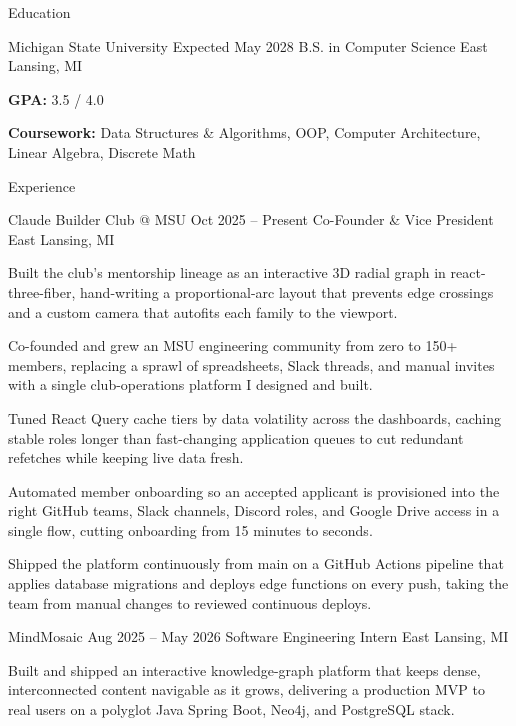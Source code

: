 \documentclass[
	11pt
]{../../../template}
\begin{document}
	\begin{rSection}{E}{ducation}
		\begin{rSectionEntry}
			{Michigan State University}
			{Expected May 2028}
			{B.S. in Computer Science}
			{}
			{East Lansing, MI}

			\item \textbf{GPA:} 3.5 / 4.0
			\item \textbf{Coursework:} Data Structures \& Algorithms, OOP, Computer Architecture, Linear Algebra, Discrete Math
		\end{rSectionEntry}
	\end{rSection}

	\begin{rSection}{E}{xperience}
		\begin{rSectionEntry}
			{Claude Builder Club @ MSU}
			{Oct 2025 -- Present}
			{Co-Founder \& Vice President}
			{}
			{East Lansing, MI}

			\item Built the club's mentorship lineage as an interactive 3D radial graph in react-three-fiber, hand-writing a proportional-arc layout that prevents edge crossings and a custom camera that autofits each family to the viewport.
			\item Co-founded and grew an MSU engineering community from zero to 150+ members, replacing a sprawl of spreadsheets, Slack threads, and manual invites with a single club-operations platform I designed and built.
			\item Tuned React Query cache tiers by data volatility across the dashboards, caching stable roles longer than fast-changing application queues to cut redundant refetches while keeping live data fresh.
			\item Automated member onboarding so an accepted applicant is provisioned into the right GitHub teams, Slack channels, Discord roles, and Google Drive access in a single flow, cutting onboarding from 15 minutes to seconds.
			\item Shipped the platform continuously from main on a GitHub Actions pipeline that applies database migrations and deploys edge functions on every push, taking the team from manual changes to reviewed continuous deploys.
		\end{rSectionEntry}

		\begin{rSectionEntry}
			{MindMosaic}
			{Aug 2025 -- May 2026}
			{Software Engineering Intern}
			{}
			{East Lansing, MI}

			\item Built and shipped an interactive knowledge-graph platform that keeps dense, interconnected content navigable as it grows, delivering a production MVP to real users on a polyglot Java Spring Boot, Neo4j, and PostgreSQL stack.
		\end{rSectionEntry}
	\end{rSection}
\end{document}
